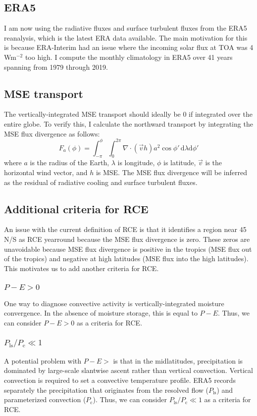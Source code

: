 \documentclass[11pt]{article}
\begin{document}
\subsection{ERA5}
\label{sec:org72e4393}
I am now using the radiative fluxes and surface turbulent fluxes from the ERA5 reanalysis, which is the latest ERA data available. The main motivation for this is because ERA-Interim had an issue where the incoming solar flux at TOA was 4 Wm\(^{-2}\) too high. I compute the monthly climatology in ERA5 over 41 years spanning from 1979 through 2019.

\subsection{MSE transport}
\label{sec:org04d8332}
The vertically-integrated MSE transport should ideally be 0 if integrated over the entire globe. To verify this, I calculate the northward transport by integrating the MSE flux divergence as follows:
\begin{equation}
F_a(\phi) = \int_{-\pi}^{\phi}\int_{0}^{2\pi} \!\nabla\cdot(\vec{v}h)a^2\cos{\phi'} \, \mathrm{d}\lambda \mathrm{d}\phi'
\end{equation}
where \(a\) is the radius of the Earth, \(\lambda\) is longitude, \(\phi\) is latitude, \(\vec{v}\) is the horizontal wind vector, and \(h\) is MSE. The MSE flux divergence will be inferred as the residual of radiative cooling and surface turbulent fluxes.

\subsection{Additional criteria for RCE}
\label{sec:orgcb9caed}
An issue with the current definition of RCE is that it identifies a region near 45 N/S as RCE yearround because the MSE flux divergence is zero. These zeros are unavoidable because MSE flux divergence is positive in the tropics (MSE flux out of the tropics) and negative at high latitudes (MSE flux into the high latitudes). This motivates us to add another criteria for RCE.
\subsubsection{\(P-E>0\)}
\label{sec:org0ecf3d9}
One way to diagnose convective activity is vertically-integrated moisture convergence. In the absence of moisture storage, this is equal to \(P-E\). Thus, we can consider \(P-E>0\) as a criteria for RCE.
\subsubsection{\(P_{\mathrm{ls}}/P_{\mathrm{c}} \ll 1\)}
\label{sec:org477a594}
A potential problem with \(P-E>\) is that in the midlatitudes, precipitation is dominated by large-scale slantwise ascent rather than vertical convection. Vertical convection is required to set a convective temperature profile. ERA5 records separately the precipitation that originates from the resolved flow (\(P_{\mathrm{ls}}\)) and parameterized convection (\(P_\mathrm{c}\)). Thus, we can consider \(P_{\mathrm{ls}}/P_\mathrm{c} \ll 1\) as a criteria for RCE.
\end{document}
